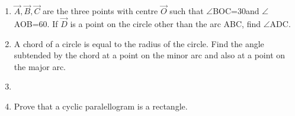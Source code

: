 \begin{enumerate}[label=\thesection.\arabic*,ref=\thesection.\theenumi]
\item  $\vec{A},\vec{B},\vec{C}$ are the three points with centre $\vec{O}$ such that $\angle$BOC=30\degree and $\angle$AOB=60\degree. If $\vec{D}$ is a point on the circle other than the arc ABC, find $\angle$ADC.
\label{chapters/9/10/5/1}
\\
\solution

\item A chord of a circle is equal to the radius of the circle. Find the angle subtended by the chord at a point on the minor arc and also at a point on the major arc.
\label{chapters/9/10/5/2}
\\
\solution


\item 
\label{chapters/9/10/5/3}

    \item Prove that a cyclic paralellogram is a rectangle.
\label{chapters/9/10/5/12}
\\
\solution


\end{enumerate}
